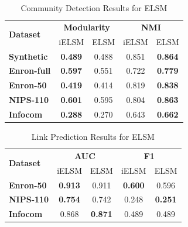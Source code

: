 \documentclass[letterpaper]{article} %
\begin{document}
\begin{table}[t]
\caption{Community Detection Results for ELSM}
\label{table:ELSM_clustering_results}
\vskip 0.1in
\begin{center}
\begin{small}
\begin{sc}
\begin{tabular}{p{1.9cm}cccc}
\toprule
\multirow{2}{*}{\textbf{Dataset}} & \multicolumn{2}{c}{\textbf{Modularity}} & \multicolumn{2}{c}{\textbf{NMI}} \\
& iELSM & ELSM  & iELSM & ELSM \\
\midrule
\textbf{Synthetic} & \textbf{0.489} & 0.488 & 0.851 & \textbf{0.864} \\
\textbf{Enron-full}& \textbf{0.597} & 0.551 & 0.722 & \textbf{0.779} \\
\textbf{Enron-50}  & \textbf{0.419} & 0.414 & 0.819 & \textbf{0.838} \\
\textbf{NIPS-110}  & \textbf{0.601} & 0.595 & 0.804 & \textbf{0.863} \\
\textbf{Infocom}   & \textbf{0.288} & 0.270 & 0.643 & \textbf{0.662} \\
\bottomrule
\end{tabular}
\end{sc}
\end{small}
\end{center}
\vskip -0.1in
\end{table}

\begin{table}[t]
\caption{Link Prediction Results for ELSM}
\label{table:ELSM_linkpredictionresults}
\vskip 0.1in
\begin{center}
\begin{small}
\begin{sc}
\begin{tabular}{lcccc}
\toprule
\multirow{2}{*}{\textbf{Dataset}} & \multicolumn{2}{c}{\textbf{AUC}} & \multicolumn{2}{c}{\textbf{F1}} \\
& iELSM & ELSM & iELSM & ELSM \\
\midrule
\textbf{Enron-50}  & \textbf{0.913} & 0.911 & \textbf{0.600} & 0.596 \\
\textbf{NIPS-110}  & \textbf{0.754} & 0.742 & 0.248 & \textbf{0.251} \\
\textbf{Infocom}   & 0.868 & \textbf{0.871} & 0.489 & 0.489 \\
\bottomrule
\end{tabular}
\end{sc}
\end{small}
\end{center}
\vskip -0.1in
\end{table}
\end{document}
